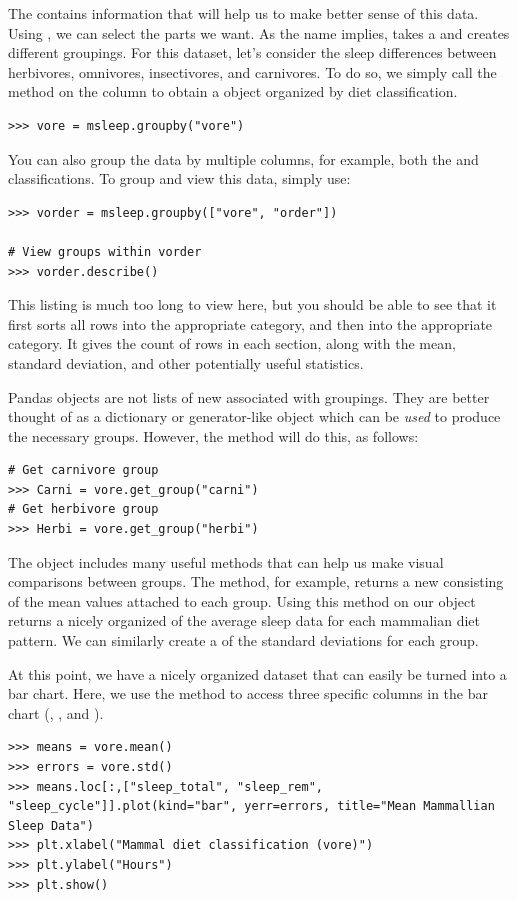 The  contains information that will help us to make better sense of this data.
Using , we can select the parts we want. As the name implies,  takes a  and creates different groupings. For this dataset, let's consider the sleep differences between herbivores, omnivores, insectivores, and carnivores. To do so, we simply call the  method on the  column to obtain a  object organized by diet classification.
\begin{lstlisting}
>>> vore = msleep.groupby("vore")
\end{lstlisting}
You can also group the data by multiple columns, for example, both the  and  classifications.
To group and view this data, simply use:
\begin{lstlisting}
>>> vorder = msleep.groupby(["vore", "order"])

# View groups within vorder
>>> vorder.describe()
\end{lstlisting}
This listing is much too long to view here, but you should be able to see that it first sorts all rows into the appropriate  category, and then into the appropriate  category.  It gives the count of rows in each section, along with the mean, standard deviation, and other potentially useful statistics.

Pandas  objects are not lists of new  associated with groupings.
They are better thought of as a dictionary or generator-like object which can be \emph{used} to produce the necessary groups.
However, the  method will do this, as follows:

\begin{lstlisting}
# Get carnivore group
>>> Carni = vore.get_group("carni")
# Get herbivore group
>>> Herbi = vore.get_group("herbi")
\end{lstlisting}

The  object includes many useful methods that can help us make visual comparisons between groups. 
The  method, for example, returns a new  consisting of the mean values attached to each group.
Using this method on our  object returns a nicely organized  of the average sleep data for each mammalian diet pattern.
We can similarly create a  of the standard deviations for each group.

At this point, we have a nicely organized dataset that can easily be turned into a bar chart.
Here, we use the  method to access three specific columns in the bar chart (, , and ).
\begin{lstlisting}
>>> means = vore.mean()
>>> errors = vore.std()
>>> means.loc[:,["sleep_total", "sleep_rem", "sleep_cycle"]].plot(kind="bar", yerr=errors, title="Mean Mammallian Sleep Data")
>>> plt.xlabel("Mammal diet classification (vore)")
>>> plt.ylabel("Hours")
>>> plt.show()
\end{lstlisting}

